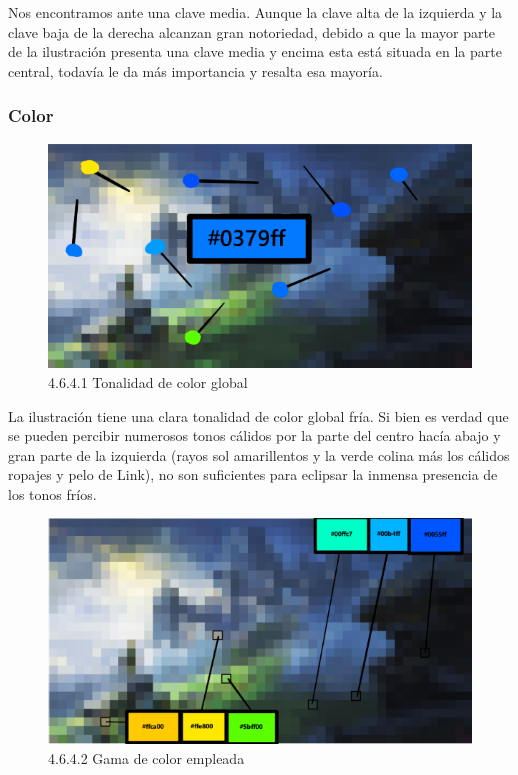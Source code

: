 \documentclass[12pt]{article}
\begin{document}
    Nos encontramos ante una clave media. Aunque la clave alta de la izquierda y la clave baja de la derecha alcanzan gran notoriedad, debido a que la mayor parte de la ilustración presenta una clave media y encima esta está situada en la parte central, todavía le da más importancia y resalta esa mayoría.


        \subsubsection{Color}


    \begin{figure}[H]
      \centering
      \includegraphics[width=\textwidth]{images/Nerea/Nerea Zelda concept 641.PNG}
      \caption{\small 4.6.4.1 Tonalidad de color global}
    \end{figure}

    La ilustración tiene una clara tonalidad de color global fría. Si bien es verdad que se pueden percibir numerosos tonos cálidos por la parte del centro hacía abajo y gran parte de la izquierda (rayos sol amarillentos y la verde colina más los cálidos ropajes y pelo de Link), no son suficientes para eclipsar la inmensa presencia de los tonos fríos.

    \begin{figure}[H]
      \centering
      \includegraphics[width=\textwidth]{images/Nerea/Nerea Zelda concept 642.PNG}
      \caption{\small 4.6.4.2 Gama de color empleada}
    \end{figure}
\end{document}
